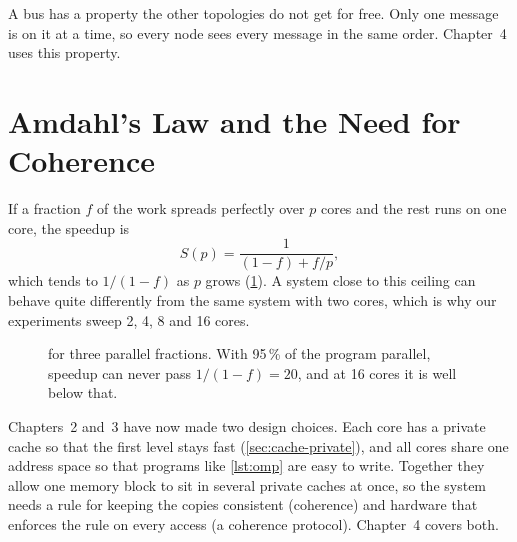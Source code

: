 A bus has a property the other topologies do not get for free. Only one message
is on it at a time, so every node sees every message in the same order.
Chapter~4 uses this property.

\section{Amdahl's Law and the Need for Coherence}
\label{sec:par-amdahl}
\label{sec:par-coherence}
%

If a fraction $f$ of the work spreads perfectly over $p$ cores and the rest runs on
one core, the speedup is~\cite{amdahl1967validity}\cite[\S12.2.3]{sarangi2025basic}
\begin{equation}
  S(p) = \frac{1}{(1-f) + f/p},
  \label{eq:amdahl}
\end{equation}
which tends to $1/(1-f)$ as $p$ grows (\cref{fig:amdahl}). A system close to this
ceiling can behave quite differently from the same system with two cores, which is
why our experiments sweep 2, 4, 8 and 16 cores.

\begin{figure}[htbp]
\centering
{}
\caption[Amdahl's law]{ for three parallel fractions. With
95\,\% of the program parallel, speedup can never pass $1/(1-f)=20$, and at 16
cores it is well below that.}
\label{fig:amdahl}
\end{figure}

Chapters~2 and~3 have now made two design choices. Each core has a private cache
so that the first level stays fast (\cref{sec:cache-private}), and all cores share
one address space so that programs like \cref{lst:omp} are easy to write. Together
they allow one memory block to sit in several private caches at once, so the
system needs a rule for keeping the copies consistent (coherence) and hardware
that enforces the rule on every access (a coherence protocol). Chapter~4 covers
both.
